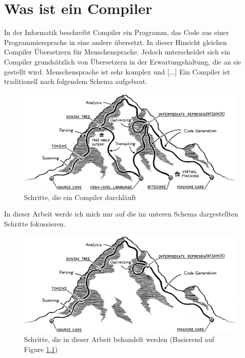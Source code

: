 \chapter{Was ist ein Compiler}
In der Informatik beschreibt Compiler ein Programm, das Code aus einer Programmiersprache in eine andere übersetzt. In dieser Hinsicht gleichen Compiler Übersetzern für Menschensprache.
Jedoch unterscheidet sich ein Compiler grundsätzlich von Übersetzern in der Erwartungshaltung, die an sie gestellt wird. Menschensprache ist sehr komplex und [...]
\newline
\newline
Ein Compiler ist traditionell nach folgendem Schema aufgebaut.

\begin{figure}[h!]
    \centering
    \includegraphics[scale=0.15]{resources/mountain.png}
    \caption{Schritte, die ein Compiler durchläuft \cite{Compiler:Mountain}}
    \label{fig:mountain}
\end{figure}

In dieser Arbeit werde ich mich nur auf die im unteren Schema dargestellten Schritte fokussieren.

\begin{figure}[h!]
    \centering
    \includegraphics[scale=0.15]{resources/mountain-edited.png}
    \caption{Schritte, die in dieser Arbeit behandelt werden (Basierend auf Figure \ref{fig:mountain})}
    \label{fig:mountain-edited}
\end{figure}

